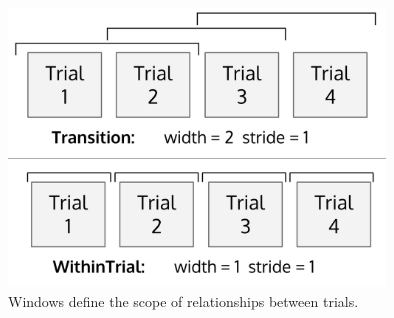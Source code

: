 \begin{figure}
    \centerline{\includegraphics[origin=c,width=10cm]{fig_windows}}
    \caption{Windows define the scope of relationships between trials.}%
    \label{fig:windows}%
\end{figure}

